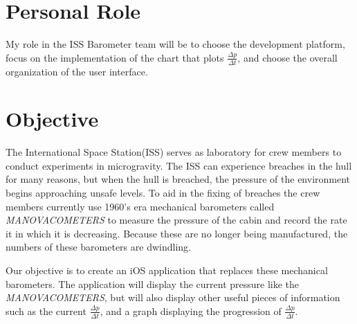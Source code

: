 \documentclass[onecolumn, draftclsnofoot,10pt, compsoc]{IEEEtran}
\begin{document}
\begin{titlepage}
\begin{singlespace}
    \end{singlespace}
\end{titlepage}
\newpage
{}
\tableofcontents
\clearpage

\section{Personal Role}
My role in the ISS Barometer team will be to choose the development platform, focus on the implementation of the chart that plots $\frac{\Delta p}{\Delta t}$, and choose the overall organization of the user interface.

\section{Objective}
The International Space Station(ISS) serves as laboratory for crew members to conduct experiments in microgravity.
The ISS can experience breaches in the hull for many reasons, but when the hull is breached, the pressure of the environment begins approaching unsafe levels.
To aid in the fixing of breaches the crew members currently use 1960's era mechanical barometers called \textit{MANOVACOMETERS} to measure the pressure of the cabin and record the rate it in which it is decreasing.
Because these are no longer being manufactured, the numbers of these barometers are dwindling.

Our objective is to create an iOS application that replaces these mechanical barometers.
 The application will display the current pressure like the \textit{MANOVACOMETERS}, but will also display other useful pieces of information such as the current $\frac{\Delta p}{\Delta t}$, and a graph displaying the progression of $\frac{\Delta p}{\Delta t}$.
\end{document}
